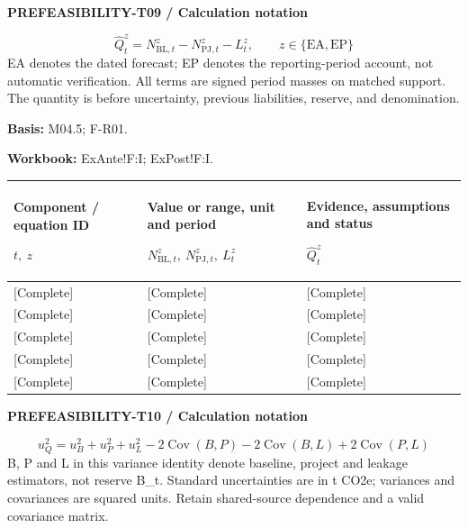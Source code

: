 \textbf{PREFEASIBILITY-T09 / Calculation notation}\par
{\fontsize{9}{11}\selectfont\[ \widehat Q_t^z=N_{\mathrm{BL},t}^z-N_{\mathrm{PJ},t}^z-L_t^z,\qquad z\in\{\mathrm{EA},\mathrm{EP}\} \]}
EA denotes the dated forecast; EP denotes the reporting-period account, not automatic verification. All terms are signed period masses on matched support. The quantity is before uncertainty, previous liabilities, reserve, and denomination.\par
\textbf{Basis:} M04.5; F-R01.\par
\textbf{Workbook:} ExAnte!F:I; ExPost!F:I.\par\endgroup
{\sffamily\fontsize{8.3}{10.3}\selectfont\begin{longtable}{@{}P{51.14mm} P{49.49mm} P{64.34mm}@{}}
\toprule
\textbf{Component / equation ID}\par {\normalfont\fontsize{8.2}{10}\selectfont $t,\ z$} & \textbf{Value or range, unit and period}\par {\normalfont\fontsize{8.2}{10}\selectfont $N_{\mathrm{BL},t}^z,\ N_{\mathrm{PJ},t}^z,\ L_t^z$} & \textbf{Evidence, assumptions and status}\par {\normalfont\fontsize{8.2}{10}\selectfont $\widehat Q_t^z$}\\\midrule\endhead
\rule{0pt}{7.7mm}[Complete] & [Complete] & [Complete]\\\hline
\rule{0pt}{7.7mm}[Complete] & [Complete] & [Complete]\\\hline
\rule{0pt}{7.7mm}[Complete] & [Complete] & [Complete]\\\hline
\rule{0pt}{7.7mm}[Complete] & [Complete] & [Complete]\\\hline
\rule{0pt}{7.7mm}[Complete] & [Complete] & [Complete]\\\hline
\end{longtable}}
\par\begingroup\sffamily\fontsize{8}{10}\selectfont\color{NEBGreen}\setlength{\parskip}{2pt}\setlength{\abovedisplayskip}{4pt}\setlength{\belowdisplayskip}{4pt}\setlength{\abovedisplayshortskip}{2pt}\setlength{\belowdisplayshortskip}{3pt}
\textbf{PREFEASIBILITY-T10 / Calculation notation}\par
{\fontsize{9}{11}\selectfont\[ u_Q^2=u_B^2+u_P^2+u_L^2-2\operatorname{Cov}(B,P)-2\operatorname{Cov}(B,L)+2\operatorname{Cov}(P,L) \]}
B, P and L in this variance identity denote baseline, project and leakage estimators, not reserve B\_t. Standard uncertainties are in t CO2e; variances and covariances are squared units. Retain shared-source dependence and a valid covariance matrix.\par
